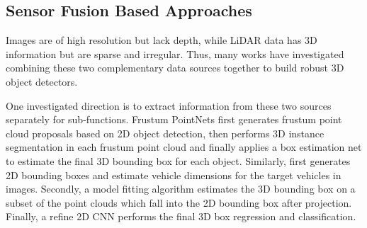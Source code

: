 \documentclass[a4paper,12pt]{article}
\begin{document}
\subsection{Sensor Fusion Based Approaches}

Images are of high resolution but lack depth, while LiDAR data has 3D information but are sparse and irregular. Thus, many works have investigated combining these two complementary data sources together to build robust 3D object detectors. 

One investigated direction is to extract information from these two sources separately for sub-functions. Frustum PointNets \cite{DBLP:journals/corr/abs-1711-08488} first generates frustum point cloud proposals based on 2D object detection, then performs 3D instance segmentation in each frustum point cloud and finally applies a box estimation net to estimate the final 3D bounding box for each object. Similarly, \cite{DBLP:journals/corr/abs-1803-00387} first generates 2D bounding boxes and estimate vehicle dimensions for the target vehicles in images. Secondly, a model fitting algorithm estimates the 3D bounding box on a subset of the point clouds which fall into the 2D bounding box after projection. Finally, a refine 2D CNN performs the final 3D box regression and classification.
\end{document}
